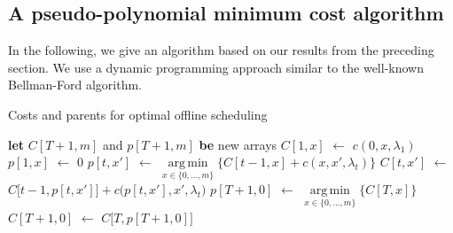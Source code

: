 \documentclass[hidelinks]{article}
\newcommand\Let[2]{\State #1 $\gets$ #2}
\newcommand\Blet[2]{\State \textbf{let} #1 \textbf{be} #2}
\theoremstyle{plain}
\theoremstyle{definition}
\theoremstyle{rem}
\newcommand{\fromto}[2]{\{#1,\ldots,#2\}}
\DeclareMathOperator*{\argmin}{arg\,min}
\begin{document}
\subsection{A pseudo-polynomial minimum cost algorithm}
In the following, we give an algorithm based on our results from the preceding section. We use a dynamic programming approach similar to the well-known Bellman-Ford algorithm.
\begin{algorithm}[H]
    \caption{Costs and parents for optimal offline scheduling}
    \begin{algorithmic}[1]
	\Blet{$C[T+1,m]$ and $p[T+1,m]$}{new arrays}
		\Let{$C[1,x]$}{$c(0,x,\lambda_1)$}
		\Let{$p[1,x]$}{$0$}
	\EndFor
			\Let{$p[t,x']$}{$\argmin\limits_{x\in\fromto{0}{m}}\bigl\{C[t-1,x]+c(x,x',\lambda_t)\bigr\}$}
			\Let{$C[t,x']$}{$C\bigl[t-1,p[t,x']\bigr]+c\bigl(p[t,x'],x',\lambda_t\bigr)$}
		\EndFor
	\EndFor
	\Let{$p[T+1,0]$}{$\argmin\limits_{x\in\fromto{0}{m}}\bigl\{C[T,x]\bigr\}$}
	\Let{$C[T+1,0]$}{$C\bigl[T,p[T+1,0]\bigr]$}
	\State {}
  \EndFunction
  \end{algorithmic}
\label{alg_opt_offline}
\end{algorithm}
\end{document}
